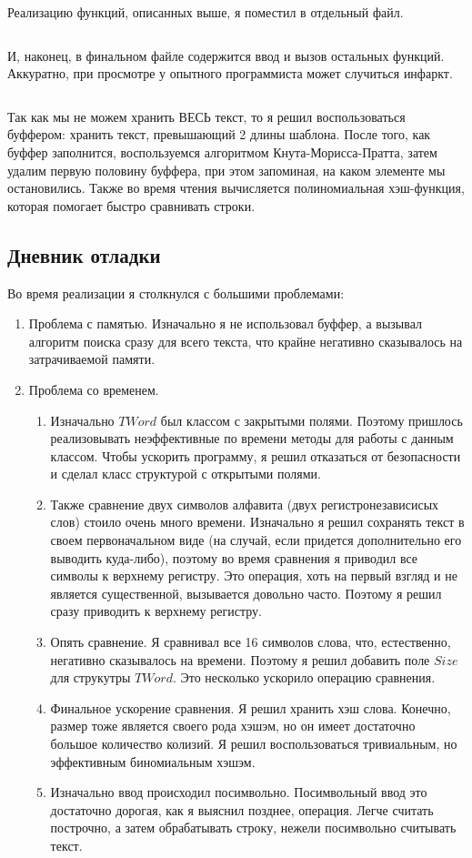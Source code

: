 \documentclass[12pt]{article}
\begin{document}
	\inputminted[breaklines]{C++}{../src/TWord.hpp}
	
	Реализацию функций, описанных выше, я поместил в отдельный файл.
	
	\inputminted[breaklines]{C++}{../src/TWord.cpp}
	 
	И, наконец, в финальном файле содержится ввод и вызов остальных функций. Аккуратно, при просмотре у опытного программиста может случиться инфаркт.
	
	\inputminted[breaklines]{C++}{../src/main.cpp}
	
	Так как мы не можем хранить ВЕСЬ текст, то я решил воспользоваться буффером: хранить текст, превышающий 2 длины шаблона. После того, как буффер заполнится, воспользуемся алгоритмом Кнута-Морисса-Пратта, затем удалим первую половину буффера, при этом запоминая, на каком элементе мы остановились. Также во время чтения вычисляется полиномиальная хэш-функция, которая помогает быстро сравнивать строки.
	
	\subsection*{Дневник отладки}
	Во время реализации я столкнулся с большими проблемами:
	\begin{enumerate}
		\item Проблема с памятью. Изначально я не использовал буффер, а вызывал алгоритм поиска сразу для всего текста, что крайне негативно сказывалось на затрачиваемой памяти.
		\item Проблема со временем.
		\begin{enumerate}
			\item Изначально $TWord$ был классом с закрытыми полями. Поэтому пришлось реализовывать неэффективные по времени методы для работы с данным классом. Чтобы ускорить программу, я решил отказаться от безопасности и сделал класс структурой с открытыми полями.
			\item Также сравнение двух символов алфавита (двух регистронезависисых слов) стоило очень много времени. Изначально я решил сохранять текст в своем первоначальном виде (на случай, если придется дополнительно его выводить куда-либо), поэтому во время сравнения я приводил все символы к верхнему регистру. Это операция, хоть на первый взгляд и не является существенной, вызывается довольно часто. Поэтому я решил сразу приводить к верхнему регистру.
			\item Опять сравнение. Я сравнивал все 16 символов слова, что, естественно, негативно сказывалось на времени. Поэтому я решил добавить поле $Size$ для струкутры $TWord$. Это несколько ускорило операцию сравнения.
			\item Финальное ускорение сравнения. Я решил хранить хэш слова. Конечно, размер тоже является своего рода хэшэм, но он имеет достаточно большое количество колизий. Я решил воспользоваться тривиальным, но эффективным биномиальным хэшэм.
			\item Изначально ввод происходил посимвольно. Посимвольный ввод это достаточно дорогая, как я выяснил позднее, операция. Легче считать построчно, а затем обрабатывать строку, нежели посимвольно считывать текст.
		\end{enumerate}
	\end{enumerate}
\end{document}
